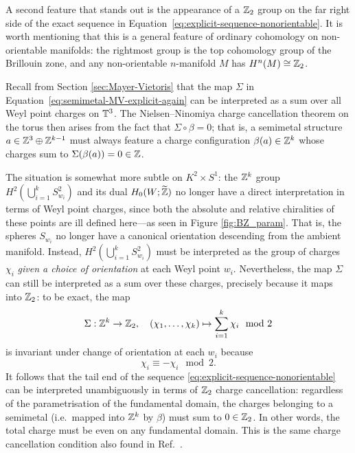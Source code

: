 A second feature that stands out is the appearance of a $\mathbb{Z}_2$ group on the far right side of the exact sequence in Equation~\eqref{eq:explicit-sequence-nonorientable}. It is worth mentioning that this is a general feature of ordinary cohomology on non-orientable manifolds: the rightmost group is the top cohomology group of the Brillouin zone, and any non-orientable $n$-manifold $M$ has $H^n(M)\cong\mathbb{Z}_2$.

Recall from Section \ref{sec:Mayer-Vietoris} that the map $\Sigma$ in Equation~\eqref{eq:semimetal-MV-explicit-again} can be interpreted as a sum over all Weyl point charges on $\mathbb{T}^3$. The Nielsen--Ninomiya charge cancellation theorem on the torus then arises from the fact that $\Sigma\circ\beta = 0$; that is, a semimetal structure $a\in\mathbb{Z}^3\oplus\mathbb{Z}^{k-1}$ must always feature a charge configuration $\beta(a)\in\mathbb{Z}^k$ whose charges sum to $\Sigma(\beta(a)) = 0 \in \mathbb{Z}$.

The situation is somewhat more subtle on $K^2\times S^1$: the $\mathbb{Z}^k$ group $H^2\!\left(\bigcup_{i=1}^k S_{w_i}^2\right)$ and its dual $H_0(W;\widetilde{\mathbb{Z}})$ no longer have a direct interpretation in terms of Weyl point charges, since both the absolute and relative chiralities of these points are ill defined here---as seen in Figure \ref{fig:BZ_param}. That is, the spheres $S_{w_i}$ no longer have a canonical orientation descending from the ambient manifold. Instead, $H^2\!\left(\bigcup_{i=1}^k S_{w_i}^2\right)$ must be interpreted as the group of charges $\chi_i$ \emph{given a choice of orientation} at each Weyl point $w_i$. Nevertheless, the map $\Sigma$ can still be interpreted as a sum over these charges, precisely because it maps into $\mathbb{Z}_2$: to be exact, the map
\begin{equation}\label{eq:map-sigma}
	\Sigma: \mathbb{Z}^k\to\mathbb{Z}_2,\quad (\chi_1,\ldots,\chi_k) \mapsto \sum_{i=1}^{k}\chi_i \mod 2
\end{equation}
is invariant under change of orientation at each $w_i$ because
\begin{equation*}
	\chi_i \equiv -\chi_i \mod 2.
\end{equation*}
It follows that the tail end of the sequence \eqref{eq:explicit-sequence-nonorientable} can be interpreted unambiguously in terms of $\mathbb{Z}_2$ charge cancellation: regardless of the parametrisation of the fundamental domain, the charges belonging to a semimetal (i.e.\ mapped into $\mathbb{Z}^k$ by $\beta$) must sum to $0\in\mathbb{Z}_2$. In other words, the total charge must be even on any fundamental domain. This is the same charge cancellation condition also found in Ref.~\cite{Fonseca-Vaidya_nonorientable}.

